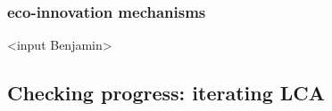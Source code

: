 \documentclass{article}
\begin{document}
\subsubsection{eco-innovation mechanisms}
\label{sec:ecoAsit}
{\color{red}\textless input Benjamin\textgreater}

\subsection{Checking progress: iterating LCA}
\label{sec:check}

\begin{comment}

\section{tools for implementation}
\label{sec:tools}
ecodesign pilot - communication - engineering tools


\section{Take-aways}
\label{sec:TakeAways}
\begin{itemize}
	\item product lifecycle
	\item Folie 19 AIIT
\end{itemize}

\end{comment}



\end{document}
